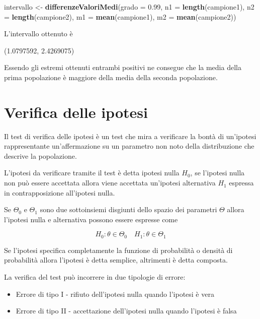 \documentclass[]{book}
\newenvironment{Shaded}{\begin{snugshade}}{\end{snugshade}}
\newcommand{\KeywordTok}[1]{\textcolor[rgb]{0.13,0.29,0.53}{\textbf{#1}}}
\newcommand{\DataTypeTok}[1]{\textcolor[rgb]{0.13,0.29,0.53}{#1}}
\newcommand{\FloatTok}[1]{\textcolor[rgb]{0.00,0.00,0.81}{#1}}
\newcommand{\StringTok}[1]{\textcolor[rgb]{0.31,0.60,0.02}{#1}}
\newcommand{\NormalTok}[1]{#1}
\begin{document}
\begin{Shaded}
\begin{Highlighting}[]
\NormalTok{intervallo <-}\StringTok{ }\KeywordTok{differenzeValoriMedi}\NormalTok{(}\DataTypeTok{grado =} \FloatTok{0.99}\NormalTok{, }
                               \DataTypeTok{n1 =} \KeywordTok{length}\NormalTok{(campione1), }\DataTypeTok{n2 =} \KeywordTok{length}\NormalTok{(campione2), }
                               \DataTypeTok{m1 =} \KeywordTok{mean}\NormalTok{(campione1), }\DataTypeTok{m2 =} \KeywordTok{mean}\NormalTok{(campione2))}
\end{Highlighting}
\end{Shaded}

L'intervallo ottenuto è

(1.0797592, 2.4269075)

Essendo gli estremi ottenuti entrambi positivi ne consegue che la media
della prima popolazione è maggiore della media della seconda
popolazione.

\chapter{Verifica delle ipotesi}\label{verifica-delle-ipotesi}

Il test di verifica delle ipotesi è un test che mira a verificare la
bontà di un'ipotesi rappresentante un'affermazione su un parametro non
noto della distribuzione che descrive la popolazione.

L'ipotesi da verificare tramite il test è detta ipotesi nulla \(H_0\),
se l'ipotesi nulla non può essere accettata allora viene accettata
un'ipotesi alternativa \(H_1\) espressa in contrapposizione all'ipotesi
nulla.

Se \(\Theta_0\) e \(\Theta_1\) sono due sottoinsiemi disgiunti dello
spazio dei parametri \(\Theta\) allora l'ipotesi nulla e alternativa
possono essere espresse come

\[H_0: \theta \in \Theta_0 \quad H_1: \theta \in \Theta_1\]

Se l'ipotesi specifica completamente la funzione di probabilità o
densità di probabilità allora l'ipotesi è detta semplice, altrimenti è
detta composta.

La verifica del test può incorrere in due tipologie di errore:

\begin{itemize}
\item
  Errore di tipo I - rifiuto dell'ipotesi nulla quando l'ipotesi è vera
\item
  Errore di tipo II - accettazione dell'ipotesi nulla quando l'ipotesi è
  falsa
\end{itemize}
\end{document}
